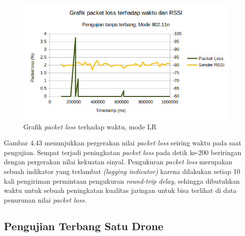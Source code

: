 \begin{figure}[H]
	\centering
	\includegraphics[scale=0.7]{./assets/Graphs/NoFly_11N/PacketLoss-Time}
	\caption{Grafik \textit{packet loss} terhadap waktu, mode LR}
\end{figure}
Gambar 4.43 menunjukkan pergerakan nilai \textit{packet loss} seiring waktu pada saat pengujian. Sempat terjadi peningkatan \textit{packet loss} pada detik ke-200 beriringan dengan pergerakan nilai kekuatan sinyal. Pengukuran \textit{packet loss} merupakan sebuah indikator yang terlambat \textit{(lagging indicator)} karena dilakukan setiap 10 kali pengiriman permintaan pengukuran \textit{round-trip delay}, sehingga dibutuhkan waktu untuk sebuah peningkatan kualitas jaringan untuk bisa terlihat di data penurunan nilai \textit{packet loss}.

\subsection{Pengujian Terbang Satu Drone}
